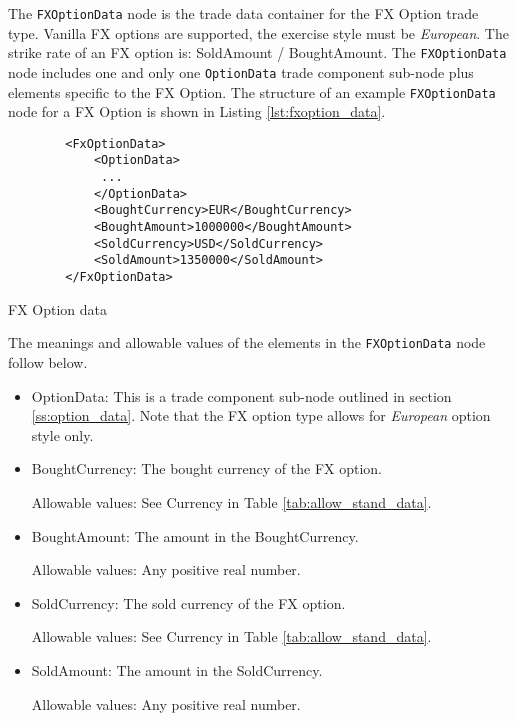 The \lstinline!FXOptionData!  node is the trade data container for the FX Option trade type.  Vanilla FX options are
supported, the exercise style must be \emph{European}. The strike rate of an FX option is: SoldAmount / BoughtAmount. The
\lstinline!FXOptionData!  node includes one and only one \lstinline!OptionData! trade component sub-node plus elements
specific to the FX Option. The structure of an example \lstinline!FXOptionData! node for a FX Option is shown in Listing
\ref{lst:fxoption_data}.

\begin{listing}[H]
\begin{verbatim}
        <FxOptionData>
            <OptionData>
             ...
            </OptionData>
            <BoughtCurrency>EUR</BoughtCurrency>
            <BoughtAmount>1000000</BoughtAmount>
            <SoldCurrency>USD</SoldCurrency>
            <SoldAmount>1350000</SoldAmount>
        </FxOptionData>
\end{verbatim}
\caption{FX Option data}
\label{lst:fxoption_data}
\end{listing}

The meanings and allowable values of the elements in the \lstinline!FXOptionData!  node follow below.

\begin{itemize}
\item OptionData: This is a trade component sub-node outlined in section \ref{ss:option_data}. Note that the
  FX option type allows for \emph{European} option style only.

\item BoughtCurrency: The bought currency of the FX option.  

Allowable values:  See Currency in Table \ref{tab:allow_stand_data}.

\item BoughtAmount: The amount in the BoughtCurrency.  

Allowable values:  Any positive real number.

\item SoldCurrency: The sold currency of the FX option.  

Allowable values:  See Currency in Table \ref{tab:allow_stand_data}.

\item SoldAmount: The amount in the SoldCurrency.  

Allowable values:  Any positive real number.

\end{itemize}

